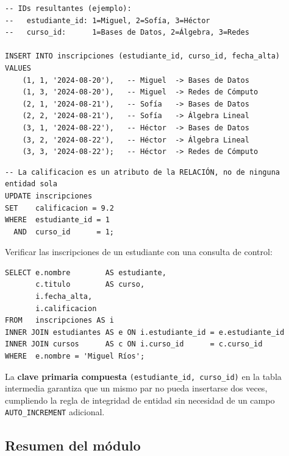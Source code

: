 \begin{lstlisting}[style=sql, caption={Paso 2 — insertar en la tabla intermedia}]
-- IDs resultantes (ejemplo):
--   estudiante_id: 1=Miguel, 2=Sofía, 3=Héctor
--   curso_id:      1=Bases de Datos, 2=Álgebra, 3=Redes

INSERT INTO inscripciones (estudiante_id, curso_id, fecha_alta)
VALUES
    (1, 1, '2024-08-20'),   -- Miguel  -> Bases de Datos
    (1, 3, '2024-08-20'),   -- Miguel  -> Redes de Cómputo
    (2, 1, '2024-08-21'),   -- Sofía   -> Bases de Datos
    (2, 2, '2024-08-21'),   -- Sofía   -> Álgebra Lineal
    (3, 1, '2024-08-22'),   -- Héctor  -> Bases de Datos
    (3, 2, '2024-08-22'),   -- Héctor  -> Álgebra Lineal
    (3, 3, '2024-08-22');   -- Héctor  -> Redes de Cómputo
\end{lstlisting}

\begin{lstlisting}[style=sql, caption={Paso 3 — actualizar atributos propios de la relación}]
-- La calificacion es un atributo de la RELACIÓN, no de ninguna entidad sola
UPDATE inscripciones
SET    calificacion = 9.2
WHERE  estudiante_id = 1
  AND  curso_id      = 1;
\end{lstlisting}

\begin{ejemplo}
  Verificar las inscripciones de un estudiante con una consulta de control:

\begin{lstlisting}[style=sql, caption={Consulta de verificación post-inserción N:M}]
SELECT e.nombre        AS estudiante,
       c.titulo        AS curso,
       i.fecha_alta,
       i.calificacion
FROM   inscripciones AS i
INNER JOIN estudiantes AS e ON i.estudiante_id = e.estudiante_id
INNER JOIN cursos      AS c ON i.curso_id      = c.curso_id
WHERE  e.nombre = 'Miguel Ríos';
\end{lstlisting}
\end{ejemplo}

\begin{nota}
  La \textbf{clave primaria compuesta} \texttt{(estudiante\_id, curso\_id)} en
  la tabla intermedia garantiza que un mismo par no pueda insertarse dos veces,
  cumpliendo la regla de integridad de entidad sin necesidad de un campo
  \texttt{AUTO\_INCREMENT} adicional.
\end{nota}

\subsection*{Resumen del módulo}

